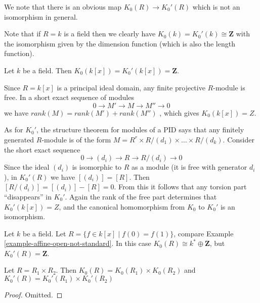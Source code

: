\medskip\noindent
We note that there is an obvious map $K_0(R) \to K_0'(R)$
which is not an isomorphism in general.

\begin{example}
\label{example-K0-field}
Note that if $R = k$ is a field then we clearly have
$K_0(k) = K_0'(k) \cong \mathbf{Z}$ with the isomorphism
given by the dimension function (which is also the length function).
\end{example}

\begin{example}
\label{example-K0-polynomial-ring}
Let $k$ be a field. Then $K_0(k[x]) = K_0'(k[x]) = \mathbf{Z}$.

\medskip\noindent
Since $R = k[x]$ is a principal ideal domain, any finite projective
$R$-module is free. In a short exact sequence of modules
$$
0 \rightarrow M'\rightarrow M\rightarrow M''\rightarrow 0
$$
we have $rank(M) = rank(M')+rank(M'')$ , which gives $K_0(k[x]) = Z$.

\medskip\noindent
As for $K_0'$, the structure theorem for modules of a PID says that
any finitely generated $R$-module is of the form
$M = R^r \times R/(d_1) \times \dots \times R/(d_k)$.
Consider the short exact sequence
$$
0 \rightarrow (d_i) \rightarrow R \rightarrow R/(d_i) \rightarrow 0
$$
Since the ideal $(d_i)$ is isomorphic to $R$ as a module
(it is free with generator $d_i$), in $K_0'(R)$ we have
$[(d_i)] = [R]$.  Then $[R/(d_i)] = [(d_i)]-[R] = 0$.  From this it
follows that any torsion part ``disappears'' in $K_0'$.
Again the rank of the free part determines that $K_0'(k[x]) = Z$,
and the canonical homomorphism from $K_0$ to $K_0'$ is an isomorphism.
\end{example}

\begin{example}
\label{example-K0-node}
Let $k$ be a field. Let $R = \{f \in k[x] \mid f(0) = f(1)\}$,
compare Example \ref{example-affine-open-not-standard}.
In this case $K_0(R) \cong k^* \oplus \mathbf{Z}$, but
$K_0'(R) = \mathbf{Z}$.
\end{example}

\begin{lemma}
\label{lemma-K0-product}
Let $R = R_1 \times R_2$. Then $K_0(R) = K_0(R_1) \times K_0(R_2)$
and $K_0'(R) = K_0'(R_1) \times K_0'(R_2)$
\end{lemma}

\begin{proof}
Omitted.
\end{proof}

